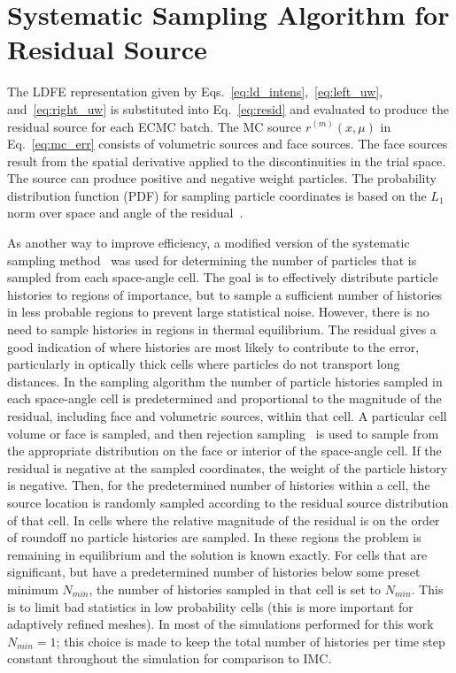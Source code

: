 \section{Systematic Sampling Algorithm for Residual Source}
\label{sec:systematic_sampling}

The LDFE representation given by Eqs.~\eqref{eq:ld_intens},~\eqref{eq:left_uw},
and~\eqref{eq:right_uw} is substituted into
Eq.~\eqref{eq:resid} and evaluated to produce the residual source for each ECMC batch. 
The MC source $r^{(m)}(x,\mu)$ in Eq.~\eqref{eq:mc_err}
consists of volumetric sources and face sources.  The face sources result from the spatial
derivative applied to the discontinuities in the
trial space.  The source can produce positive and
negative weight particles.  The probability distribution function (PDF) for sampling particle coordinates is based on the $L_1$
norm over space and angle of the residual~\cite{jake}.  

As another way to improve efficiency, a modified version of the systematic sampling
method~\cite{shultis_mc} was used for determining the number of particles that is sampled
from each space-angle cell.    The goal is
to effectively distribute particle histories to regions of importance, but to sample a
sufficient number of histories in less probable regions to prevent large statistical
noise.  However, there is no need to sample histories in regions in thermal equilibrium.
The residual gives a good indication of where histories are most likely to contribute to
the error, particularly in optically thick cells where particles do not transport long
distances.   In
the sampling algorithm the number of particle histories sampled in each space-angle cell
is predetermined and proportional to the magnitude of the residual, including face and
volumetric sources, within that cell. A particular cell volume or face 
is sampled, and then rejection sampling~\cite{shultis_mc} is used to sample from
the appropriate distribution on the face or interior of the space-angle cell.  If the
residual is negative at the sampled coordinates, the weight of the particle history is negative.
 Then, for the predetermined number of histories
within a cell, the source location is randomly sampled according to the residual source
distribution of that cell.  In cells where the relative magnitude of the residual is on the order of roundoff no particle histories are sampled. In these 
regions the problem is remaining in equilibrium and the solution is known exactly.  For
cells that are significant, but have a predetermined number of histories below some preset
minimum $N_{min}$, the number of histories sampled in that cell is set to $N_{min}$. This
is to limit bad statistics in low probability cells (this is more important for
adaptively refined meshes).  In most of the simulations performed for this work
$N_{min}=1$; this
choice is made to keep the total number of histories per time step constant throughout
the simulation for comparison to IMC.  

